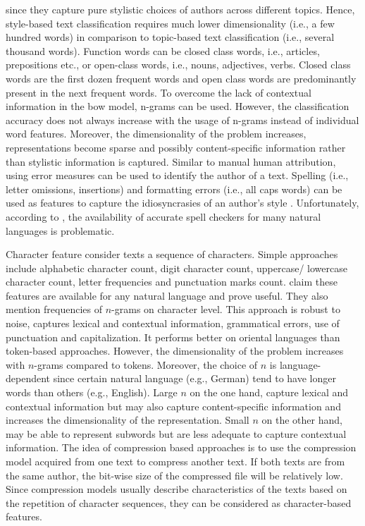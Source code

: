 since they capture pure stylistic choices of authors across different topics.
Hence, style-based text classification requires much lower dimensionality (i.e., a few hundred words) 
in comparison to topic-based text classification (i.e., several thousand words).
Function words can be closed class words, i.e., articles, prepositions etc., 
or open-class words, i.e., nouns, adjectives, verbs.
Closed class words are the first dozen frequent words and 
open class words are predominantly present in the next frequent words.
To overcome the lack of contextual information in the \ac{bow} model, 
n-grams can be used.
However, the classification accuracy does not always increase with the usage of n-grams instead of individual word features.
Moreover, the dimensionality of the problem increases, representations become sparse and possibly content-specific information rather than stylistic information is captured.
Similar to manual human attribution, using error measures can be used to identify the author of a text.
Spelling (i.e., letter omissions, insertions) and formatting errors (i.e., all caps words) can be used as features 
to capture the idiosyncrasies of an author's style \cite{elmanarelbouanani_authorship_2014,bevendorff_overview_2024}.
Unfortunately, according to \cite{stamatatos_survey_2009}, the availability of accurate spell checkers for many natural languages is problematic.


Character feature consider texts a sequence of characters.
Simple approaches include alphabetic character count, digit character count, uppercase/ lowercase character count, letter frequencies and punctuation marks count.
\citet{stamatatos_survey_2009} claim these features are available for any natural language and prove useful.
They also mention frequencies of $n$-grams on character level.
This approach is robust to noise, captures lexical and contextual information, grammatical errors, use of punctuation and capitalization.
It performs better on oriental languages than token-based approaches.
However, the dimensionality of the problem increases with $n$-grams compared to tokens.
Moreover, the choice of $n$ is language-dependent since certain natural language (e.g., German) tend to have longer words than others (e.g., English).
Large $n$ on the one hand, capture lexical and contextual information but may also capture content-specific information and increases the dimensionality of the representation.
Small $n$ on the other hand, may be able to represent subwords but are less adequate to capture contextual information.
The idea of compression based approaches is to use the compression model acquired from one text to compress another text. 
If both texts are from the same author, the bit-wise size of the compressed file will be relatively low.
Since compression models usually describe characteristics of the texts based on the repetition of character sequences, 
they can be considered as character-based features. 


